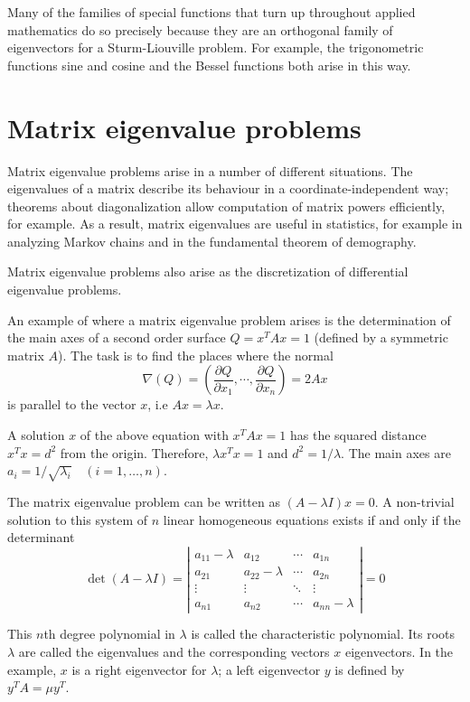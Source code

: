 \documentclass[12pt]{article}
\newcommand{\del}{\nabla}
\begin{document}
Many of the families of special functions that turn up throughout applied mathematics do so precisely because they are an orthogonal family of eigenvectors for a Sturm-Liouville problem.  For example, the trigonometric functions sine and cosine and the Bessel functions both arise in this way.

\section*{Matrix eigenvalue problems}

Matrix eigenvalue problems arise in a number of different situations.  The eigenvalues of a matrix describe its behaviour in a coordinate-independent way; theorems about diagonalization allow computation of matrix powers efficiently, for example.  As a result, matrix eigenvalues are useful in statistics, for example in analyzing Markov chains and in the fundamental theorem of demography.

Matrix eigenvalue problems also arise as the discretization of differential eigenvalue problems.

An example of where a matrix eigenvalue problem arises is the determination of the main axes of a second order surface $Q=x^TAx=1$ (defined by a symmetric matrix $A$). The task is to find the places where the normal
\[
\del (Q) = \left(\frac{\partial Q}{\partial x_1}, \cdots , \frac{\partial Q}{\partial x_n}\right) = 2 A x
\]
is parallel to the vector $x$, i.e $Ax=\lambda x$.

A solution $x$ of the above equation with $x^TAx=1$ has the squared distance $x^Tx=d^2$ from the origin. Therefore, $\lambda x^Tx =1$ and $d^2=1/\lambda$. The main axes are $a_i = 1/\sqrt{\lambda_i}\quad (i=1,\ldots,n)$.

The matrix eigenvalue problem can be written as $(A-\lambda I)x=0$.
A non-trivial solution to this system of $n$ linear homogeneous equations exists if and only if the determinant
\[
\det(A-\lambda I) = 
\left|\begin{matrix}
 a_{11}-\lambda & a_{12} & \cdots & a_{1n} \\
 a_{21} & a_{22}-\lambda & \cdots & a_{2n} \\
 \vdots & \vdots & \ddots & \vdots \\
 a_{n1} & a_{n2} & \cdots & a_{nn}-\lambda
\end{matrix} \right| = 0
\]

This $n$th degree polynomial in $\lambda$ is called the characteristic polynomial. Its roots $\lambda$ are called the eigenvalues and the corresponding vectors $x$ eigenvectors. In the example, $x$ is a right eigenvector for $\lambda$; a left eigenvector $y$ is defined by $y^TA=\mu y^T$.
\end{document}
